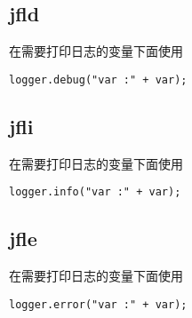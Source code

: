 \documentclass{scrartcl}
\begin{document}
\subsection{jfld}
\label{sec-6-3}


   在需要打印日志的变量下面使用

\begin{verbatim}
logger.debug("var :" + var);
\end{verbatim}
\subsection{jfli}
\label{sec-6-4}

   在需要打印日志的变量下面使用

\begin{verbatim}
logger.info("var :" + var);
\end{verbatim}
\subsection{jfle}
\label{sec-6-5}

   在需要打印日志的变量下面使用

\begin{verbatim}
logger.error("var :" + var);
\end{verbatim}
\end{document}

